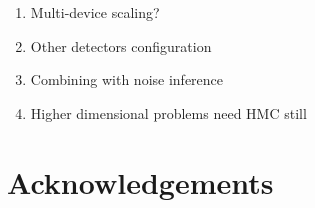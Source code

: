 \documentclass[twocolumn]{aastex631}
\begin{document}
\begin{enumerate}
    \item Multi-device scaling?
    \item Other detectors configuration
    \item  Combining with noise inference
    \item Higher dimensional problems need HMC still
\end{enumerate}



\section{Acknowledgements}


\end{document}
